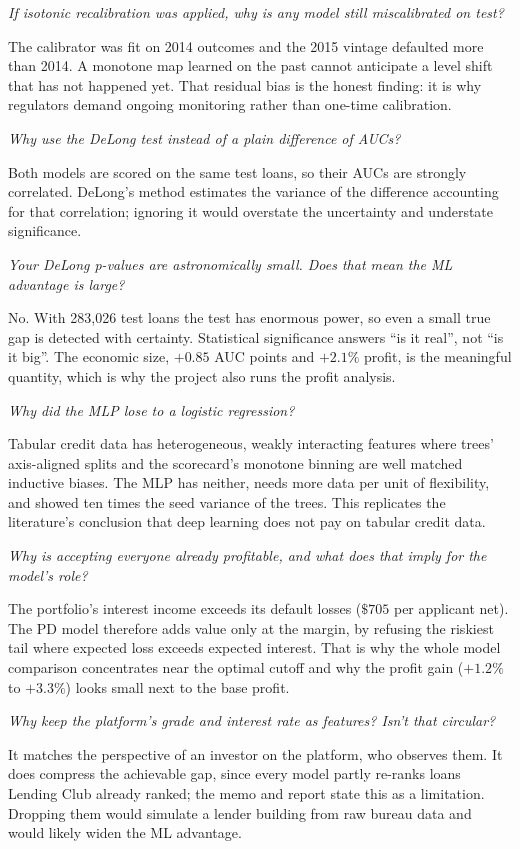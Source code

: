 \documentclass[a4paper,11pt]{article}
\newenvironment{qa}{\begin{description}[leftmargin=0pt,itemsep=6pt]}{\end{description}}
\newcommand{\Q}[1]{\item[Q.] \textit{#1}}
\newcommand{\A}{\item[A.]}
\begin{document}
\begin{qa}
\Q{If isotonic recalibration was applied, why is any model still miscalibrated on test?}
\A The calibrator was fit on 2014 outcomes and the 2015 vintage defaulted more than 2014. A monotone map learned on the past cannot anticipate a level shift that has not happened yet. That residual bias is the honest finding: it is why regulators demand ongoing monitoring rather than one-time calibration.

\Q{Why use the DeLong test instead of a plain difference of AUCs?}
\A Both models are scored on the same test loans, so their AUCs are strongly correlated. DeLong's method estimates the variance of the difference accounting for that correlation; ignoring it would overstate the uncertainty and understate significance.

\Q{Your DeLong p-values are astronomically small. Does that mean the ML advantage is large?}
\A No. With 283{,}026 test loans the test has enormous power, so even a small true gap is detected with certainty. Statistical significance answers ``is it real'', not ``is it big''. The economic size, $+0.85$ AUC points and $+2.1\%$ profit, is the meaningful quantity, which is why the project also runs the profit analysis.

\Q{Why did the MLP lose to a logistic regression?}
\A Tabular credit data has heterogeneous, weakly interacting features where trees' axis-aligned splits and the scorecard's monotone binning are well matched inductive biases. The MLP has neither, needs more data per unit of flexibility, and showed ten times the seed variance of the trees. This replicates the literature's conclusion that deep learning does not pay on tabular credit data.

\Q{Why is accepting everyone already profitable, and what does that imply for the model's role?}
\A The portfolio's interest income exceeds its default losses ($\$705$ per applicant net). The PD model therefore adds value only at the margin, by refusing the riskiest tail where expected loss exceeds expected interest. That is why the whole model comparison concentrates near the optimal cutoff and why the profit gain ($+1.2\%$ to $+3.3\%$) looks small next to the base profit.

\Q{Why keep the platform's grade and interest rate as features? Isn't that circular?}
\A It matches the perspective of an investor on the platform, who observes them. It does compress the achievable gap, since every model partly re-ranks loans Lending Club already ranked; the memo and report state this as a limitation. Dropping them would simulate a lender building from raw bureau data and would likely widen the ML advantage.


\end{qa}
\end{document}
